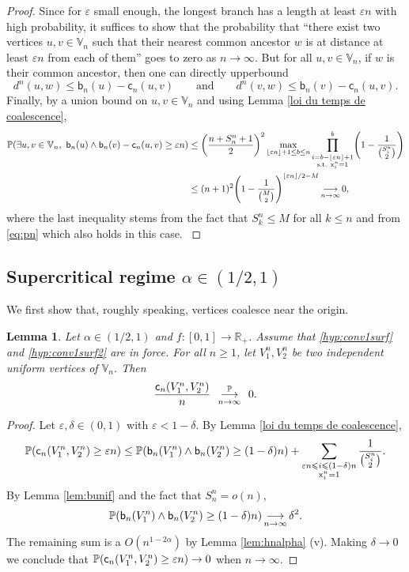 \documentclass[11pt]{article}
\theoremstyle{plain}
\newtheorem{lemma}[theorem]{Lemma}
\theoremstyle{definition}
\theoremstyle{remark}
\newcommand{\R}{\mathbb{R}} %
\renewcommand{\P}{{\mathbb{P}}} %
\newcommand{\1}{\mathbbm{1}} %
\newcommand{\proba}[1]{\mathbb{P}\left(#1\right)} %
\newcommand{\e}{\varepsilon} %
\newcommand{\birth}{\mathsf{b}} %
\newcommand{\coal}{\mathsf{c}} %
\newcommand{\X}{\mathrm x} %
\newcommand{\V}{\mathbb{V}} %
\newcommand{\cvproba}[1][n]{\enskip\mathop{\longrightarrow}^{\P}_{#1 \to \infty}\enskip}
\let\originalleft\left
\let\originalright\right
\renewcommand{\left}{\mathopen{}\mathclose\bgroup\originalleft}
\renewcommand{\right}{\aftergroup\egroup\originalright}
\begin{document}
\begin{proof}
{Since for $\e$ small enough, the longest branch has a length at least $\e n$ with high probability, it suffices to show that the probability that ``there exist two vertices $u,v \in \V_n$ such that their nearest common ancestor $w$ is at distance at least $\e n$ from each of them'' goes to zero as $n\to \infty$. But for all $u,v \in \V_n$, if $w$ is their common ancestor, then one can directly upperbound
$$
d^n(u,w)\le  \birth_n(u)-\coal_n(u,v) \qquad \text{and} \qquad
d^n(v,w) \le \birth_n(v)-\coal_n(u,v).
$$
Finally, by a union bound on $u,v \in \V_n$ and using Lemma \ref{loi du temps de coalescence},
\begin{align*}
\P\left( \exists u, v \in \V_n, \ 
\birth_n(u)\wedge \birth_n(v) -\coal_n(u,v) \ge \e n
\right)
&\le
\left(\frac{n+S_n^n+1}{2}\right)^2
\max_{\lfloor\e n \rfloor+1\le b \le n}\prod_{\substack{i=b-\lfloor \e n \rfloor+1 \\ \text{s.t. } \X^n_i=1}}^b \left( 1-\frac{1}{\binom{S_i^n}{2}}\right) \\
&\le (n+1)^2 \left( 1-\frac{1}{\binom{M}{2}}\right)^{\lfloor \e n\rfloor/2 - M}
\mathop{\longrightarrow}\limits_{n\to \infty} 0,
\end{align*}
where the last inequality stems from the fact that $S^n_k\le M$ for all $k\le n$ and from \eqref{eq:pn} which also holds in this case.
}
\end{proof}

\subsection{Supercritical regime \texorpdfstring{$\alpha \in (1/2,1)$}{}}

We first show that, roughly speaking, vertices coalesce near the origin.

\begin{lemma}
\label{lemme ça coalesce en zéro}
Let $\alpha \in (1/2,1)$ and $f:[0,1] \rightarrow \R_+$. Assume that \ref{hyp:conv1surf} and \ref{hyp:conv1surf2} are in force. For all $n \ge 1$, let $V^n_1, V_2^n$ be two independent uniform vertices of $\V_{n}$. Then
\[
\frac{\coal_{n}(V^{n}_{1},V^{n}_{2})}{n}\cvproba[n] 0.
\]
\end{lemma}

\begin{proof}
Let $\e,\delta \in(0,1)$ with $\e<1-\delta$. By Lemma \ref{loi du temps de coalescence},
\[
\proba{\coal_{n}(V^{n}_{1},V^{n}_{2}) \ge \e n}\leq\proba{\birth_{n}(V^{n}_{1}) \wedge \birth_{n}(V^{n}_{2}) \ge (1-\delta)n} + 
\sum_{\substack{\e n \leqslant i \leqslant (1-\delta)n \\ \X^n_i=1}} \frac{1}{\binom{S_i^n}{2}}.
\]
By Lemma \ref{lem:bunif} and the fact that $S_{n}^n = o(n)$,
\[
\proba{\birth_{n}(V^{n}_{1}) \wedge \birth_{n}(V^{n}_{2}) \ge (1-\delta)n} \mathop{\longrightarrow}\limits_{n \to \infty} \delta^2.
\]
The remaining sum is a $O(n^{1-2\alpha})$ by Lemma \ref{lem:hnalpha} (v).  Making $\delta\to0$ we conclude that $\proba{\coal_{n}(V^{n}_{1},V^{n}_{2}) \ge \e n}\to0$ when $n\to\infty$.
\end{proof}
\end{document}
